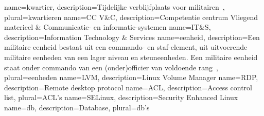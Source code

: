 {
    name=kwartier,
    description={Tijdelijke verblijfplaats voor militairen~\autocite{Wikipedia2021}},
    plural=kwartieren
}
{
    name={CC V\&C},
    description={Competentie centrum Vliegend materieel \& Communicatie- en informatie-systemen}
}
{
    name=IT\&S,
    description={Information Technology \& Services}
}
{
    name=eenheid,
    description={Een militaire eenheid bestaat uit een commando- en staf-element, uit uitvoerende militaire eenheden van een lager niveau en steuneenheden. Een militaire eenheid staat onder commando van een (onder)officier van voldoende rang~\autocite{Wikipedia2021a}},
    plural=eenheden
}
{
    name=LVM,
    description={Linux Volume Manager}
}
{
    name=RDP,
    description={Remote desktop protocol}
}
{
    name=ACL,
    description={Access control list},
    plural={ACL's}
}
{
    name=SELinux,
    description={Security Enhanced Linux}
}
{
    name=db,
    description={Database},
    plural=db's
}